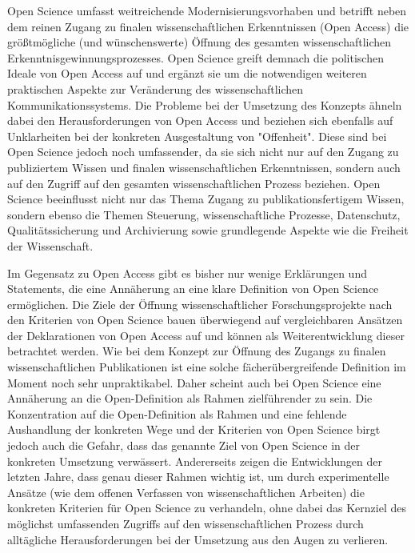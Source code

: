 Open Science umfasst weitreichende Modernisierungsvorhaben und betrifft neben dem reinen Zugang zu finalen wissenschaftlichen Erkenntnissen (Open Access) die größtmögliche (und wünschenswerte) Öffnung des gesamten wissenschaftlichen Erkenntnisgewinnungsprozesses. Open Science greift demnach die politischen Ideale von Open Access auf und ergänzt sie um die notwendigen weiteren praktischen Aspekte zur Veränderung des wissenschaftlichen Kommunikationssystems. Die Probleme bei der Umsetzung des Konzepts ähneln dabei den Herausforderungen von Open Access und beziehen sich ebenfalls auf Unklarheiten bei der konkreten Ausgestaltung von "Offenheit". Diese sind bei Open Science jedoch noch umfassender, da sie sich nicht nur auf den Zugang zu publiziertem Wissen und finalen wissenschaftlichen Erkenntnissen, sondern auch auf den Zugriff auf den gesamten wissenschaftlichen Prozess beziehen. Open Science beeinflusst nicht nur das Thema Zugang zu publikationsfertigem Wissen, sondern ebenso die Themen Steuerung, wissenschaftliche Prozesse, Datenschutz, Qualitätssicherung und Archivierung sowie grundlegende Aspekte wie die Freiheit der Wissenschaft.

Im Gegensatz zu Open Access gibt es bisher nur wenige Erklärungen und Statements, die eine Annäherung an eine klare Definition von Open Science ermöglichen. Die Ziele der Öffnung wissenschaftlicher Forschungsprojekte nach den Kriterien von Open Science bauen überwiegend auf vergleichbaren Ansätzen der Deklarationen von Open Access auf und können als Weiterentwicklung dieser betrachtet werden. Wie bei dem Konzept zur Öffnung des Zugangs zu finalen wissenschaftlichen Publikationen ist eine solche fächerübergreifende Definition im Moment noch sehr unpraktikabel. Daher scheint auch bei Open Science eine Annäherung an die Open-Definition als Rahmen zielführender zu sein. Die Konzentration auf die Open-Definition als Rahmen und eine fehlende Aushandlung der konkreten Wege und der Kriterien von Open Science birgt jedoch auch die Gefahr, dass das genannte Ziel von Open Science in der konkreten Umsetzung verwässert. Andererseits zeigen die Entwicklungen der letzten Jahre, dass genau dieser Rahmen wichtig ist, um durch experimentelle Ansätze (wie dem offenen Verfassen von wissenschaftlichen Arbeiten) die konkreten Kriterien für Open Science zu verhandeln, ohne dabei das Kernziel des möglichst umfassenden Zugriffs auf den wissenschaftlichen Prozess durch alltägliche Herausforderungen bei der Umsetzung aus den Augen zu verlieren.

